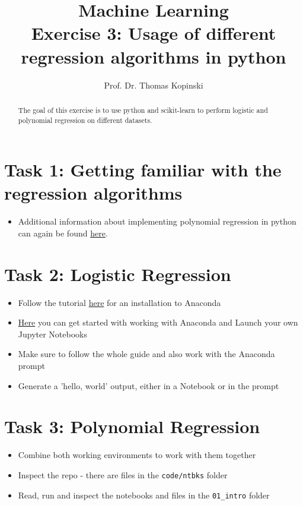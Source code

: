 \documentclass{article}
\title{Machine Learning \\ Exercise 3: Usage of different regression algorithms in python}
\author{Prof. Dr. Thomas Kopinski}
\begin{document}
\maketitle

\begin{abstract}
The goal of this exercise is to use python and scikit-learn to perform logistic and polynomial regression on different datasets.
\end{abstract}

\section*{Task 1: Getting familiar with the regression algorithms}

\begin{itemize}
    \item Additional information about implementing polynomial regression in python can again be found \href{https://github.com/DataScienceLabFHSWF/machine-learning-book/blob/main/notebooks/ch09/ch09.ipynb}{here}.
\end{itemize}

\section*{Task 2: Logistic Regression}

\begin{itemize}
    \item Follow the tutorial \href{https://docs.anaconda.com/anaconda/install/index.html}{here} for an installation to Anaconda
    \item \href{https://docs.anaconda.com/anaconda/user-guide/getting-started/}{Here} you can get started with working with Anaconda and Launch your own Jupyter Notebooks
    \item Make sure to follow the whole guide and also work with the Anaconda prompt
    \item Generate a 'hello, world' output, either in a Notebook or in the prompt
\end{itemize}

\section*{Task 3: Polynomial Regression}

\begin{itemize}
    \item Combine both working environments to work with them together
    \item Inspect the repo - there are files in the \verb+code/ntbks+  folder
    \item Read, run and inspect the notebooks and files in the \verb+01_intro+ folder

\end{itemize}

%
%
\end{document}
